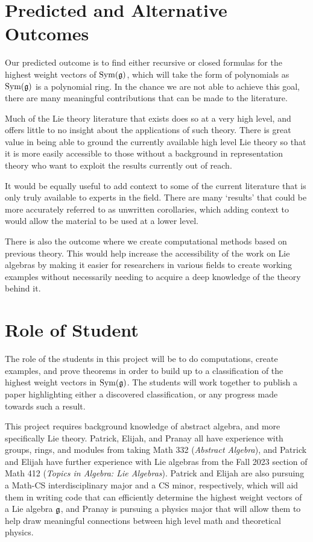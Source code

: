 \documentclass[11pt, reqno]{amsart}
\begin{document}
\section{Predicted and Alternative Outcomes}

Our predicted outcome is to find either recursive or closed formulas for the highest weight vectors of $\operatorname{Sym}(\mathfrak{g})$, which will take the form of polynomials as $\operatorname{Sym}(\mathfrak{g})$ is a polynomial ring. In the chance we are not able to achieve this goal, there are many meaningful contributions that can be made to the literature.

Much of the Lie theory literature that exists does so at a very high level, and offers little to no insight about the applications of such theory. There is great value in being able to ground the currently available high level Lie theory so that it is more easily accessible to those without a background in representation theory who want to exploit the results currently out of reach.

It would be equally useful to add context to some of the current literature that is only truly available to experts in the field. There are many `results' that could be more accurately referred to as unwritten corollaries, which adding context to would allow the material to be used at a lower level.

There is also the outcome where we create computational methods based on previous theory. This would help increase the accessibility of the work on Lie algebras by making it easier for researchers in various fields to create working examples without necessarily needing to acquire a deep knowledge of the theory behind it.


\section{Role of Student}

The role of the students in this project will be to do computations, create examples, and prove theorems in order to build up to a classification of the highest weight vectors in $\operatorname{Sym}(\mathfrak{g})$. The students will work together to publish a paper highlighting either a discovered classification, or any progress made towards such a result. 

This project requires background knowledge of abstract algebra, and more specifically Lie theory. Patrick, Elijah, and Pranay all have experience with groups, rings, and modules from taking Math 332 (\emph{Abstract Algebra}), and Patrick and Elijah have further experience with Lie algebras from the Fall 2023 section of Math 412 (\emph{Topics in Algebra: Lie Algebras}). Patrick and Elijah are also pursuing a Math-CS interdisciplinary major and a CS minor, respectively, which will aid them in writing code that can efficiently determine the highest weight vectors of a Lie algebra $\mathfrak{g}$, and Pranay is pursuing a physics major that will allow them to help draw meaningful connections between high level math and theoretical physics.
\end{document}
